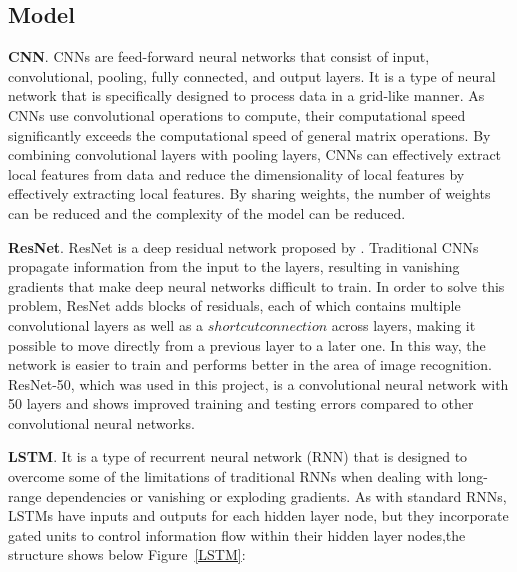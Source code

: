 \documentclass[11pt,a4paper]{article}
\begin{document}
\begin{spacing}{1.5}
\subsection{Model}

\textbf{CNN}.
CNNs are feed-forward neural networks that consist of input, convolutional, pooling, fully connected, and output layers. It is a type of neural network that is specifically designed to process data in a grid-like manner.
As CNNs use convolutional operations to compute, their computational speed significantly exceeds the computational speed of general matrix operations. By combining convolutional layers with pooling layers, CNNs can effectively extract local features from data and reduce the dimensionality of local features by effectively extracting local features. By sharing weights, the number of weights can be reduced and the complexity of the model can be reduced.\par

\textbf{ResNet}.
ResNet is a deep residual network proposed by \citet{he2016deep}. Traditional CNNs propagate information from the input to the layers, resulting in vanishing gradients that make deep neural networks difficult to train. In order to solve this problem, ResNet adds blocks of residuals, each of which contains multiple convolutional layers as well as a $shortcut connection$ across layers, making it possible to move directly from a previous layer to a later one.
In this way, the network is easier to train and performs better in the area of image recognition. ResNet-50, which was used in this project, is a convolutional neural network with 50 layers and shows improved training and testing errors compared to other convolutional neural networks.

\textbf{LSTM}.
It is a type of recurrent neural network (RNN) that is designed to overcome some of the limitations of traditional RNNs when dealing with long-range dependencies or vanishing or exploding gradients.
As with standard RNNs, LSTMs have inputs and outputs for each hidden layer node, but they incorporate gated units to control information flow within their hidden layer nodes,the structure shows below Figure~\ref{LSTM}:


\end{spacing}
\end{document}

